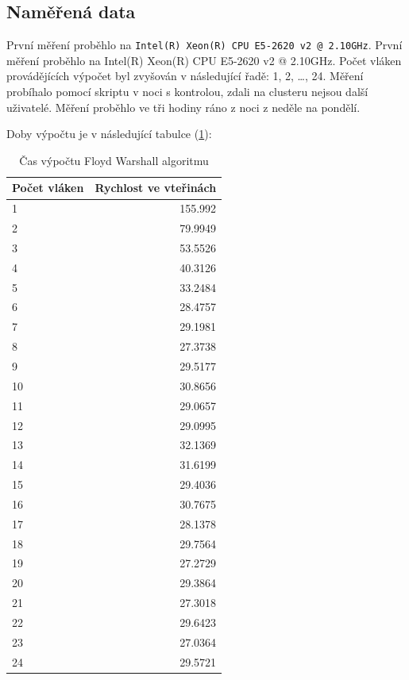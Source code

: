 \documentclass[10pt,a4paper]{article}
\begin{document}
\subsection{Naměřená data}

První měření proběhlo na \texttt{Intel(R) Xeon(R) CPU E5-2620 v2 @ 2.10GHz}. První měření proběhlo na Intel(R) Xeon(R) CPU E5-2620 v2 @ 2.10GHz. Počet vláken provádějících výpočet byl zvyšován v následující řadě: 1, 2, \dots , 24. Měření probíhalo pomocí skriptu v noci s kontrolou, zdali na clusteru nejsou další uživatelé. Měření proběhlo ve tři hodiny ráno z noci z neděle na pondělí.

Doby výpočtu je v následující tabulce (\ref{tab:xnfl}):
\begin{table}[H]
  \centering
	\caption{Čas výpočtu Floyd Warshall algoritmu}
	\begin{tabular}{| l | r |}
\hline
Počet vláken & Rychlost ve vteřinách \\ \hline
1 & 155.992 \\ \hline
2 & 79.9949 \\ \hline
3 & 53.5526 \\ \hline
4 & 40.3126 \\ \hline
5 & 33.2484 \\ \hline
6 & 28.4757 \\ \hline
7 & 29.1981 \\ \hline
8 & 27.3738 \\ \hline
9 & 29.5177 \\ \hline
10 & 30.8656 \\ \hline
11 & 29.0657 \\ \hline
12 & 29.0995 \\ \hline
13 & 32.1369 \\ \hline
14 & 31.6199 \\ \hline
15 & 29.4036 \\ \hline
16 & 30.7675 \\ \hline
17 & 28.1378 \\ \hline
18 & 29.7564 \\ \hline
19 & 27.2729 \\ \hline
20 & 29.3864 \\ \hline
21 & 27.3018 \\ \hline
22 & 29.6423 \\ \hline
23 & 27.0364 \\ \hline
24 & 29.5721 \\ \hline
	\end{tabular}
  \label{tab:xnfl}
\end{table}
\end{document}

